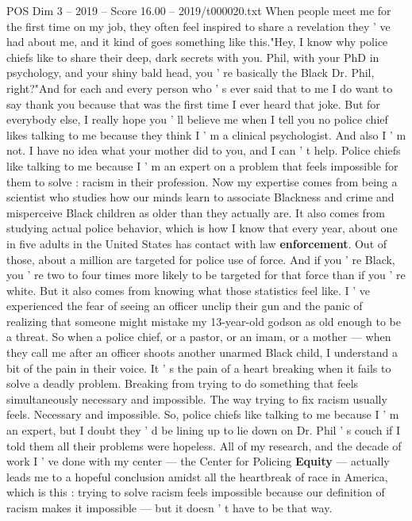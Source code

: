 \begin{textsample}{POS Dim 3 – 2019 – Score 16.00 – 2019/t000020.txt}  \label{ex:f3_pos_006}
When people meet me for the first time on my job, they often feel inspired to share a revelation they ' ve had about me, and it kind of goes something like this."Hey, I know why police chiefs like to share their deep, dark secrets with you.
Phil, with your PhD in psychology, and your shiny bald head, you ' re basically the Black Dr.
Phil, right?"And for each and every person who ' s ever said that to me I do want to say thank you because that was the first time I ever heard that joke.
But for everybody else, I really hope you ' ll believe me when I tell you no police chief likes talking to me because they think I ' m a clinical psychologist.
And also I ' m not.
I have no idea what your mother did to you, and I can ' t help.
Police chiefs like talking to me because I ' m an expert on a problem that feels impossible for them to solve : racism in their profession.
Now my expertise comes from being a scientist who studies how our minds learn to associate Blackness and crime and misperceive Black children as older than they actually are.
It also comes from studying actual police behavior, which is how I know that every year, about one in five adults in the United States has contact with law \textbf{enforcement}.
Out of those, about a million are targeted for police use of force.
And if you ' re Black, you ' re two to four times more likely to be targeted for that force than if you ' re white.
But it also comes from knowing what those statistics feel like.
I ' ve experienced the fear of seeing an officer unclip their gun and the panic of realizing that someone might mistake my 13-year-old godson as old enough to be a threat.
So when a police chief, or a pastor, or an imam, or a mother — when they call me after an officer shoots another unarmed Black child, I understand a bit of the pain in their voice.
It ' s the pain of a heart breaking when it fails to solve a deadly problem.
Breaking from trying to do something that feels simultaneously necessary and impossible.
The way trying to fix racism usually feels.
Necessary and impossible.
So, police chiefs like talking to me because I ' m an expert, but I doubt they ' d be lining up to lie down on Dr.
Phil ' s couch if I told them all their problems were hopeless.
All of my research, and the decade of work I ' ve done with my center — the Center for Policing \textbf{Equity} — actually leads me to a hopeful conclusion amidst all the heartbreak of race in America, which is this : trying to solve racism feels impossible because our definition of racism makes it impossible — but it doesn ' t have to be that way.

\end{textsample}
